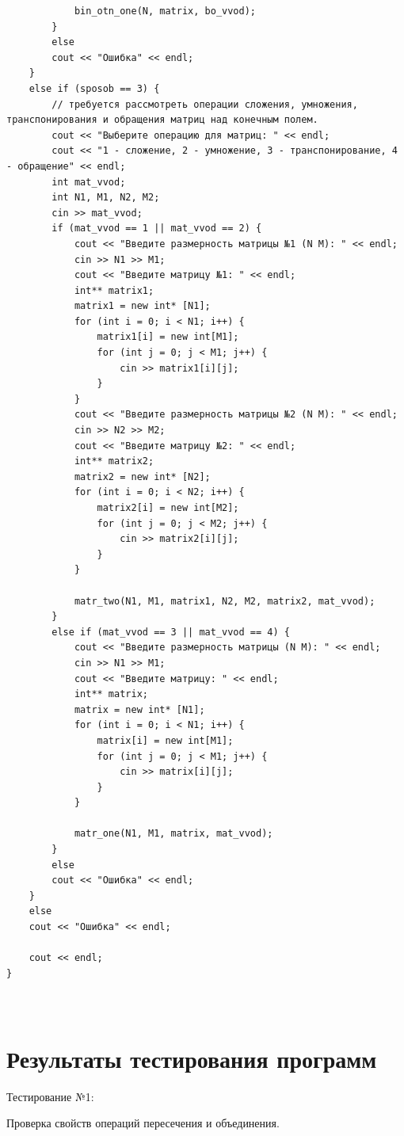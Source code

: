 \documentclass[bachelor, och, labwork]{shiza}
\begin{document}
\begin{verbatim}
			bin_otn_one(N, matrix, bo_vvod);
		}
		else
		cout << "Ошибка" << endl;
	}
	else if (sposob == 3) {
		// требуется рассмотреть операции сложения, умножения, транспонирования и обращения матриц над конечным полем.
		cout << "Выберите операцию для матриц: " << endl;
		cout << "1 - сложение, 2 - умножение, 3 - транспонирование, 4 - обращение" << endl;
		int mat_vvod;
		int N1, M1, N2, M2;
		cin >> mat_vvod;
		if (mat_vvod == 1 || mat_vvod == 2) {
			cout << "Введите размерность матрицы №1 (N M): " << endl;
			cin >> N1 >> M1;
			cout << "Введите матрицу №1: " << endl;
			int** matrix1;
			matrix1 = new int* [N1];
			for (int i = 0; i < N1; i++) {
				matrix1[i] = new int[M1];
				for (int j = 0; j < M1; j++) {
					cin >> matrix1[i][j];
				}
			}
			cout << "Введите размерность матрицы №2 (N M): " << endl;
			cin >> N2 >> M2;
			cout << "Введите матрицу №2: " << endl;
			int** matrix2;
			matrix2 = new int* [N2];
			for (int i = 0; i < N2; i++) {
				matrix2[i] = new int[M2];
				for (int j = 0; j < M2; j++) {
					cin >> matrix2[i][j];
				}
			}
			
			matr_two(N1, M1, matrix1, N2, M2, matrix2, mat_vvod);
		}
		else if (mat_vvod == 3 || mat_vvod == 4) {
			cout << "Введите размерность матрицы (N M): " << endl;
			cin >> N1 >> M1;
			cout << "Введите матрицу: " << endl;
			int** matrix;
			matrix = new int* [N1];
			for (int i = 0; i < N1; i++) {
				matrix[i] = new int[M1];
				for (int j = 0; j < M1; j++) {
					cin >> matrix[i][j];
				}
			}
			
			matr_one(N1, M1, matrix, mat_vvod);
		}
		else
		cout << "Ошибка" << endl;
	}
	else
	cout << "Ошибка" << endl;
	
	cout << endl;
}

		
	\end{verbatim}
	
	\section{Результаты тестирования программ}
	
	Тестирование №1:
	
Проверка свойств операций пересечения и объединения.
\end{document}
